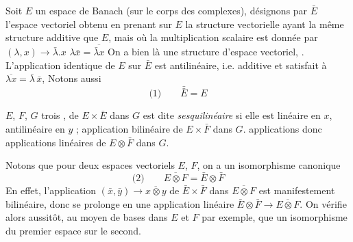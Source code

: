 \documentclass[11pt,a4paper]{article}
\begin{document}
Soit $E$ un espace de Banach (sur le corps des  complexes), désignons par $\bar{E}$ l'espace \struck{\ill{}} vectoriel obtenu en prenant sur $E$ la structure vectorielle ayant la même structure additive que $E$, mais où la multiplication scalaire \struck{\ill{}} est donnée par $(\lambda, x) \to \bar{\lambda}.x$   $\lambda \bar{x} = \overline{\bar{\lambda} x}$  On a bien là une \struck{\ill{}} structure d'espace vectoriel,  . L'application identique de $E$ sur $\bar{E}$ est antilinéaire, i.e. additive et satisfait à $\overline{\lambda x} = \bar{\lambda}\,\bar{x}$,   Notons  aussi
\[
  \text{(1)}\qquad \bar{\bar{E}} = E
\]

   $E$, $F$, $G$ \struck{\ill{}} trois  ,     de $E \times \bar{E}$ \struck{\ill{}} dans $G$ est dite \emph{sesquilinéaire} si elle est linéaire en $x$, antilinéaire en $y$ ;        application bilinéaire de $E \times \bar{F}$ dans $G$.  applications  donc   applications linéaires de $E \otimes \bar{F}$ dans $G$. 

 


Notons que pour deux espaces vectoriels $E$, $F$, on a un isomorphisme canonique
\[
  \text{(2)}\qquad \overline{E \otimes F} = \bar{E} \otimes \bar{F}
\]
En effet, l'application $(\bar{x}, \bar{y}) \to \overline{x \otimes y}$ de $\bar{E} \times \bar{F}$  dans $\overline{E \otimes F}$ est manifestement bilinéaire, donc se prolonge en une application linéaire $\bar{E} \otimes \bar{F} \to \overline{E \otimes F}$. On vérifie alors aussitôt, au moyen de bases dans $E$ et $F$ par exemple, que  un isomorphisme du premier espace sur le second.
\end{document}
